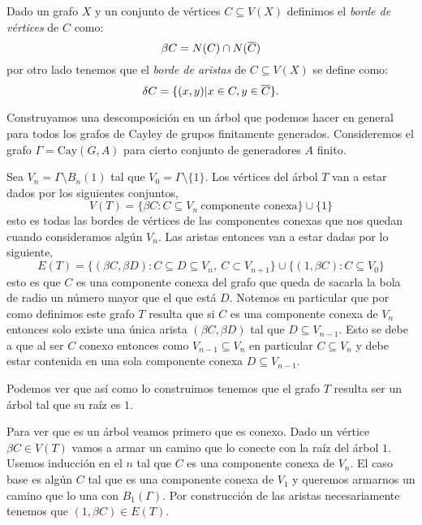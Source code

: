 \documentclass[tesis.tex]{subfiles}
\begin{document}
\begin{deff}
	Dado un grafo $X$ y un conjunto de vértices $C \subseteq V(X)$ definimos el \emph{borde de vértices} de $C$ como:
	\[
	\beta C =  N(C) \cap N(\overline{ C})
	\] 
	por otro lado tenemos que el \emph{borde de aristas} de $C \subseteq V(X)$ se define como:	
	\[
	\delta C = \{  (x,y) | x \in C, y \in \overline C    \}.
	\]
\end{deff}


\begin{ej}\label{desc-grafo-cayley}%
	
	Construyamos una descomposición en un árbol que podemos hacer en general para todos los grafos de Cayley de grupos finitamente generados. 
	Consideremos el grafo $\Gamma = \text{Cay}(G,A)$ para cierto conjunto de generadores $A$ finito.
	
	
	Sea $V_n = \Gamma \setminus B_n(1) $ tal que $V_0 = \Gamma \setminus \{1\}$. 
	Los vértices del árbol $T$ van a estar dados por los siguientes conjuntos,
	\[
	V(T) = \{  \beta C : C \subseteq V_n \ \text{componente conexa}   \} \cup \{ 1 \}
	\]
	esto es todas las bordes de vértices de las componentes conexas que nos quedan cuando consideramos algún $V_n$. 
	Las aristas entonces van a estar dadas por lo siguiente,
	\[
	E(T) = \{ (\beta C , \beta D) : C \subseteq D \subseteq V_n, \ C \subset V_{n+1}   \} \cup \{  (1, \beta C) : C \subseteq V_0  \}
	\]
	esto es que $C$ es una componente conexa del grafo que queda de sacarla la bola de radio un número mayor que el que está $D$.
	Notemos en particular que por como definimos este grafo $T$ resulta que si $C$ es una componente conexa de $V_n$ entonces solo existe una única arista $(\beta C, \beta D)$ tal que $D \subseteq V_{n-1}$. 
	Esto se debe a que al ser $C$ conexo entonces como $V_{n-1} \subseteq V_{n}$ en particular $C \subseteq V_{n}$ y debe estar contenida en una sola componente conexa $D \subseteq V_{n-1}.$
	
	
	Podemos ver que así como lo construimos tenemos que el grafo $T$ resulta ser un árbol tal que su raíz es $1$. 
	
	Para ver que es un árbol veamos primero que es conexo. Dado un vértice $\beta C \in V(T)$ vamos a armar un camino que lo conecte con la raíz del árbol $1$. 
	Usemos inducción en el $n$ tal que $C$ es una componente conexa de $V_n$. 
	El caso base es algún $C$ tal que es una componente conexa de $V_1$ y queremos armarnos un camino que lo una con $B_1(\Gamma)$. 
	Por construcción de las aristas necesariamente tenemos que $(1, \beta C) \in E(T)$.
		

\end{ej}
\end{document}
